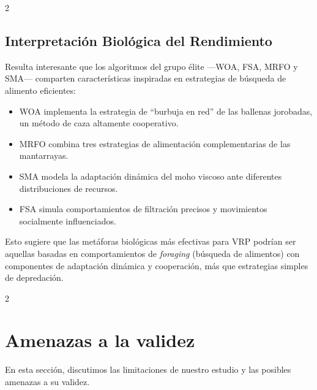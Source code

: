 \documentclass[10pt,a4paper]{extarticle}
\begin{document}
{\begin{multicols}{2}
\subsection{Interpretación Biológica del Rendimiento}
Resulta interesante que los algoritmos del grupo élite —WOA, FSA, MRFO y SMA— comparten características inspiradas en estrategias de búsqueda de alimento eficientes:
\begin{itemize}
\item WOA implementa la estrategia de ``burbuja en red'' de las ballenas jorobadas, un método de caza altamente cooperativo.
\item MRFO combina tres estrategias de alimentación complementarias de las mantarrayas.
\item SMA modela la adaptación dinámica del moho viscoso ante diferentes distribuciones de recursos.
\item FSA simula comportamientos de filtración precisos y movimientos socialmente influenciados.
\end{itemize}

Esto sugiere que las metáforas biológicas más efectivas para VRP podrían ser aquellas basadas en comportamientos de \textit{foraging} (búsqueda de alimentos) con componentes de adaptación dinámica y cooperación, más que estrategias simples de depredación.
\end{multicols}

\begin{multicols}{2}
\section{Amenazas a la validez}
En esta sección, discutimos las limitaciones de nuestro estudio y las posibles amenazas a su validez.


\end{multicols}}
\end{document}
